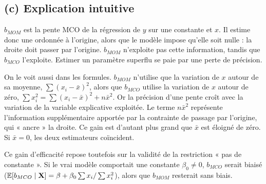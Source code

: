 \documentclass[11pt,a4paper]{article}
\newcommand{\E}{\mathbb{E}}\newcommand{\Var}{\operatorname{Var}}\newcommand{\Cov}{\operatorname{Cov}}
\begin{document}
\subsection*{(c) Explication intuitive}

$b_{MOM}$ est la pente MCO de la régression de $y$ sur une constante et $x$. Il estime donc une ordonnée à l'origine, alors que le modèle impose qu'elle soit nulle : la droite doit passer par l'origine. $b_{MOM}$ n'exploite pas cette information, tandis que $b_{MCO}$ l'exploite. Estimer un paramètre superflu se paie par une perte de précision.

On le voit aussi dans les formules. $b_{MOM}$ n'utilise que la variation de $x$ autour de sa moyenne, $\sum(x_i-\bar x)^2$, alors que $b_{MCO}$ utilise la variation de $x$ autour de zéro, $\sum x_i^2=\sum(x_i-\bar x)^2+n\bar x^2$. Or la précision d'une pente croît avec la variation de la variable explicative exploitée. Le terme $n\bar x^2$ représente l'information supplémentaire apportée par la contrainte de passage par l'origine, qui « ancre » la droite. Ce gain est d'autant plus grand que $\bar x$ est éloigné de zéro. Si $\bar x=0$, les deux estimateurs coïncident.

Ce gain d'efficacité repose toutefois sur la validité de la restriction « pas de constante ». Si le vrai modèle comportait une constante $\beta_0\ne0$, $b_{MCO}$ serait biaisé ($\E[b_{MCO}\mid\vX]=\beta+\beta_0\sum x_i/\sum x_i^2$), alors que $b_{MOM}$ resterait sans biais.
\end{document}
